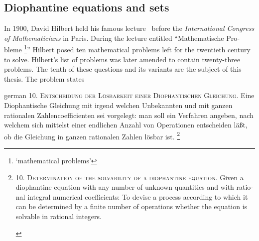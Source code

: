 %

\subsection{Diophantine equations and sets}

In 1900, David Hilbert held his famous lecture~\cite{Hilbert1900} before the
\emph{International Congress of Mathematicians} in Paris. During the lecture
entitled \foreignquote{german}{Mathematische Probleme%
\footnote{%
  \foreignquote{english}{mathematical problems}
}}
Hilbert posed ten mathematical problems left for the twentieth century to solve.
Hilbert's list of problems was later amended to contain twenty-three problems.
The tenth of these questions and its variants are the subject of this thesis.
The problem states

\begin{foreigndisplayquote}{german}
  \textsc{10. Entscheidung der Lösbarkeit einer Diophantischen Gleichung.}
  Eine Diophantische Gleichung mit irgend welchen Unbekannten und mit
  ganzen rationalen Zahlencoefficienten sei vorgelegt: man soll ein Verfahren
  angeben, nach welchem sich mittelst einer endlichen Anzahl von Operationen
  entscheiden läßt, ob die Gleichung in ganzen rationalen Zahlen lösbar ist.%
  \footnote{
    \begin{english}
      \textsc{10. Determination of the solvability of a diophantine equation.}
      Given a diophantine equation with any number of unknown quantities and
      with rational integral numerical coefficients: To devise a process
      according to which it can be determined by a finite number of operations
      whether the equation is solvable in rational integers.
      \hspace*{\fill}\cite[translation published in][]{Hilbert2000}
    \end{english}
  }
  \hspace*{\fill}\cite{Hilbert1900}
\end{foreigndisplayquote}

